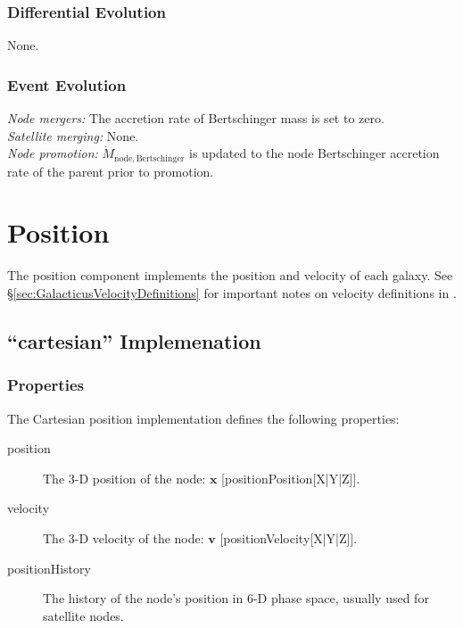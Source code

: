 \subsubsection{Differential Evolution}

None.

\subsubsection{Event Evolution}

\noindent\emph{Node mergers:} The accretion rate of Bertschinger mass is set to zero.\\

\noindent\emph{Satellite merging:} None.\\

\noindent\emph{Node promotion:} $\dot{M}_\mathrm{node, Bertschinger}$ is updated to the \gls{node} Bertschinger accretion rate of the parent prior to promotion.\\

\section{Position}\label{sec:ComponentPosition}

The position \gls{component} implements the position and velocity of each galaxy. See \S\ref{sec:GalacticusVelocityDefinitions} for important notes on velocity definitions in \glc.

\subsection{``cartesian'' Implemenation}

\subsubsection{Properties}

The Cartesian position implementation defines the following properties:
\begin{description}
 \item [{\normalfont \ttfamily position}] The 3-D position of the node: $\mathbf{x}$ [{\normalfont \ttfamily positionPosition[X|Y|Z]}].
 \item [{\normalfont \ttfamily velocity}] The 3-D velocity of the node: $\mathbf{v}$ [{\normalfont \ttfamily positionVelocity[X|Y|Z]}].
 \item [{\normalfont \ttfamily positionHistory}] The history of the node's position in 6-D phase space, usually used for satellite nodes.
\end{description}


